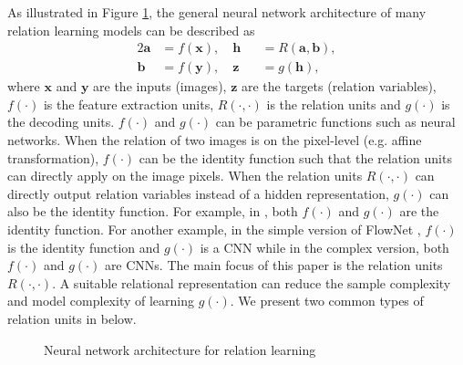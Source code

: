 \documentclass[conference]{IEEEtran}
\begin{document}
As illustrated in Figure \ref{architecture}, the general neural network architecture of many relation learning models \cite{memisevic2010learning,fischer2015flownet,agrawal2015learning} can be described as 
\begin{alignat}{2}
\mathbf{a} &= f(\mathbf{x}), \quad  \mathbf{h} &&= R(\mathbf{a},\mathbf{b}), \nonumber\\
\mathbf{b} &= f(\mathbf{y}), \quad  \mathbf{z} &&= g(\mathbf{h}),
\end{alignat}
where $\mathbf{x}$ and $\mathbf{y}$ are the inputs (images), $\mathbf{z}$ are the targets (relation variables), $f(\cdot)$ is the feature extraction units, 
$R(\cdot,\cdot)$ is the relation units and $g(\cdot)$ is the decoding units. $f(\cdot)$ and $g(\cdot)$ can be parametric functions such as neural networks. When the relation of two images is on the pixel-level (e.g. affine transformation), $f(\cdot)$ can be the identity function such that the relation units can directly apply on the image pixels. When the relation units $R(\cdot,\cdot)$ can directly output relation variables instead of a hidden representation, $g(\cdot)$ can also be the identity function.
For example, in \cite{memisevic2010learning}, both $f(\cdot)$ and $g(\cdot)$ are the identity function.
For another example, in the simple version of FlowNet \cite{fischer2015flownet}, $f(\cdot)$ is the identity function and $g(\cdot)$ is a CNN while in the complex version, both $f(\cdot)$ and $g(\cdot)$ are CNNs. 
The main focus of this paper is the relation units $R(\cdot,\cdot)$. 
A suitable relational representation can reduce the sample complexity and model complexity of learning $g(\cdot)$. We present two common types of relation units in below.



\begin{figure}[t!]
\centering
{}
\caption{Neural network architecture for relation learning}
\label{architecture}
\end{figure}
\end{document}
